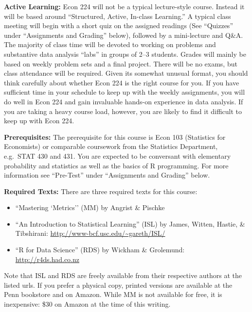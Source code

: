 \documentclass[11pt, letterpaper]{article}
\begin{document}
\noindent \textbf{Active Learning:} Econ 224 will not be a typical lecture-style course. 
Instead it will be based around ``Structured, Active, In-class Learning.'' 
A typical class meeting will begin with a short quiz on the assigned readings (See ``Quizzes'' under ``Assignments and Grading'' below), followed by a mini-lecture and Q\&A.
The majority of class time will be devoted to working on problems and substantive data analysis ``labs'' in groups of 2--3 students.
Grades will mainly be based on weekly problem sets and a final project.
There will be no exams, but class attendance will be required.
Given its somewhat unusual format, you should think carefully about whether Econ 224 is the right course for you.
If you have sufficient time in your schedule to keep up with the weekly assignments, you will do well in Econ 224 and gain invaluable hands-on experience in data analysis.
If you are taking a heavy course load, however, you are likely to find it difficult to keep up with Econ 224.


\medskip

\noindent \textbf{Prerequisites:} 
The prerequisite for this course is Econ 103 (Statistics for Economists) or comparable coursework from the Statistics Department, e.g.\ STAT 430 and 431. 
You are expected to be conversant with elementary probability and statistics as well as the basics of R programming.
For more information see ``Pre-Test'' under ``Assignments and Grading'' below.



\medskip

\noindent \textbf{Required Texts:} There are three required texts for this course:
\begin{itemize}
  \item ``Mastering `Metrics'' (MM) by Angrist \& Pischke
  \item ``An Introduction to Statistical Learning'' (ISL) by James, Witten, Hastie, \& Tibshirani: \url{http://www-bcf.usc.edu/~gareth/ISL/}
  \item ``R for Data Science'' (RDS) by Wickham \& Grolemund: \url{http://r4ds.had.co.nz}
\end{itemize}
Note that ISL and RDS are freely available from their respective authors at the listed urls. 
If you prefer a physical copy, printed versions are available at the Penn bookstore and on Amazon.
While MM is not available for free, it is inexpensive: \$30 on Amazon at the time of this writing.

\medskip
\end{document}
